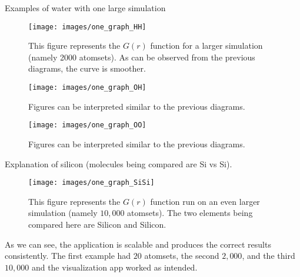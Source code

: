 

Examples of water with one large simulation

\begin{figure}[H]
\centering
\texttt{[image: images/one\_graph\_HH]}
\caption{This figure represents the $G(r)$ function for a larger simulation (namely 2000 atomsets). As can be observed from the previous diagrams, the curve is smoother.}
\end{figure}

\begin{figure}[H]
\centering
\texttt{[image: images/one\_graph\_OH]}
\caption{Figures can be interpreted similar to the previous diagrams.}
\end{figure}


\begin{figure}[H]
\centering
\texttt{[image: images/one\_graph\_OO]}
\caption{Figures can be interpreted similar to the previous diagrams.}
\end{figure}

Explanation of silicon (molecules being compared are Si vs Si).

\begin{figure}[H]
\centering
\texttt{[image: images/one\_graph\_SiSi]}
\caption{This figure represents the $G(r)$ function run on an even larger simulation (namely $10,000$ atomsets). The two elements being compared here are Silicon and Silicon.}
\end{figure}

As we can see, the application is scalable and produces the correct results consistently. The first example had $20$ atomsets, the second $2,000$, and the third $10,000$ and the visualization app worked as intended.
